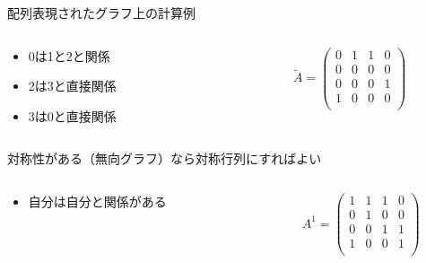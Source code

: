 \documentclass{beamer}
\begin{document}
\begin{frame}[fragile]{配列表現されたグラフ上の計算例}{}
\begin{columns}
\begin{column}{0.5\textwidth}
\begin{itemize}%
\item 0は1と2と関係
\item 2は3と直接関係
\item 3は0と直接関係
\end{itemize}
\end{column}
\begin{column}{0.5\textwidth}
\[
\tilde{A} = 
\begin{pmatrix}
0 & 1 & 1 & 0\\
0 & 0 & 0 & 0\\
0 & 0 & 0 & 1\\
1 & 0 & 0 & 0\\
\end{pmatrix}
\]
\end{column}
\end{columns}
\vfill
対称性がある（無向グラフ）なら対称行列にすればよい
\vfill
\begin{columns}
\begin{column}{0.5\textwidth}
\begin{itemize}%
\item 自分は自分と関係がある
\end{itemize}
\end{column}
\begin{column}{0.5\textwidth}
\[
A^{1} = 
\begin{pmatrix}
1 & 1 & 1 & 0\\
0 & 1 & 0 & 0\\
0 & 0 & 1 & 1\\
1 & 0 & 0 & 1\\
\end{pmatrix}
\]
\end{column}
\end{columns}
\end{frame}
\end{document}
